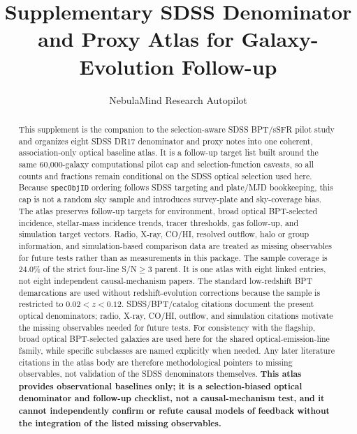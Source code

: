 \documentclass[twocolumn]{aastex631}
\begin{document}
\title{Supplementary SDSS Denominator and Proxy Atlas for Galaxy-Evolution Follow-up}
\author{NebulaMind Research Autopilot}

\begin{abstract}
This supplement is the companion to the selection-aware SDSS BPT/sSFR pilot study and organizes eight SDSS DR17 denominator and proxy notes into one coherent, association-only optical baseline atlas. It is a follow-up target list built around the same 60,000-galaxy computational pilot cap and selection-function caveats, so all counts and fractions remain conditional on the SDSS optical selection used here. Because \texttt{specObjID} ordering follows SDSS targeting and plate/MJD bookkeeping, this cap is not a random sky sample and introduces survey-plate and sky-coverage bias. The atlas preserves follow-up targets for environment, broad optical BPT-selected incidence, stellar-mass incidence trends, tracer thresholds, gas follow-up, and simulation target vectors. Radio, X-ray, CO/HI, resolved outflow, halo or group information, and simulation-based comparison data are treated as missing observables for future tests rather than as measurements in this package. The sample coverage is 24.0\% of the strict four-line S/N$\geq3$ parent. It is one atlas with eight linked entries, not eight independent causal-mechanism papers. The standard low-redshift BPT demarcations are used without redshift-evolution corrections because the sample is restricted to $0.02<z<0.12$. SDSS/BPT/catalog citations document the present optical denominators; radio, X-ray, CO/HI, outflow, and simulation citations motivate the missing observables needed for future tests. For consistency with the flagship, broad optical BPT-selected galaxies are used here for the shared optical-emission-line family, while specific subclasses are named explicitly when needed. Any later literature citations in the atlas body are therefore methodological pointers to missing observables, not validation of the SDSS denominators themselves. \textbf{This atlas provides observational baselines only; it is a selection-biased optical denominator and follow-up checklist, not a causal-mechanism test, and it cannot independently confirm or refute causal models of feedback without the integration of the listed missing observables.}
\end{abstract}

\end{document}
